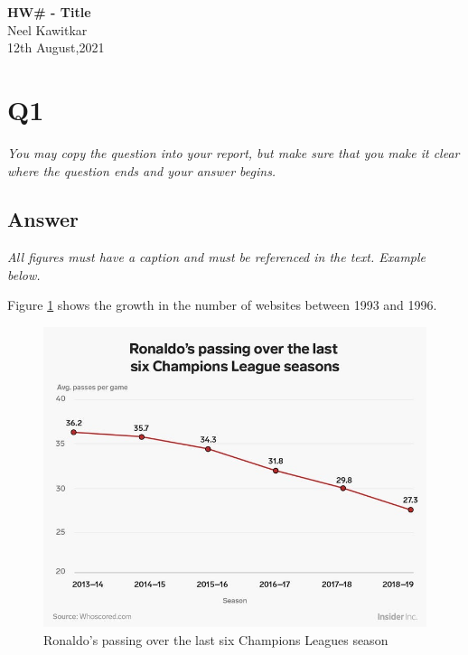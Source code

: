 \documentclass[12pt]{article}
\begin{document}
\begin{centering}
{\large\textbf{HW\# - Title}}\\ 
Neel Kawitkar\\
12th August,2021\\
\end{centering}


\section*{Q1}

\emph{You may copy the question into your report, but make sure that you make it clear where the question ends and your answer begins.}

\subsection*{Answer}

\emph{All figures must have a caption and must be referenced in the text. Example below.}

Figure \ref{fig:web-growth} shows the growth in the number of websites between 1993 and 1996.

\begin{figure}[h]
    \centering
    \includegraphics[trim=0 20 10 50, clip, width=\textwidth] {CR7.jpeg}
    \caption{Ronaldo's passing over the last six Champions Leagues season }
    \label{fig:web-growth}
\end{figure}
\end{document}

